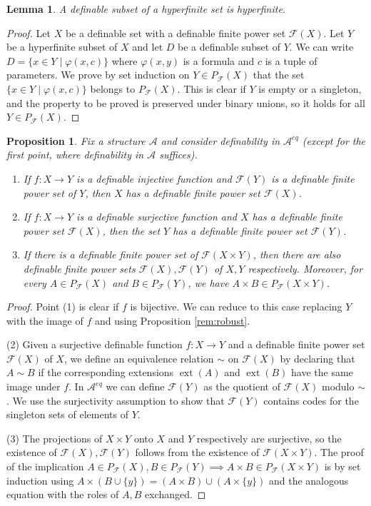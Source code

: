 \documentclass{amsart}
\newcommand{\ca}{\mathcal}
\theoremstyle{plain}
\newtheorem{prop}[thm]{Proposition}
\newtheorem{lem}[thm]{Lemma}
\theoremstyle{definition}
\newcommand{\F}{\mathcal{F}}
\newcommand{\pF}{P_{\ca F}}
\newcommand{\ext}[1]{\operatorname{ext}(#1)}
\begin{document}
\begin{lem} \label{lem:subset} 
A definable subset of a hyperfinite set is hyperfinite. 
\end{lem}
\begin{proof}
Let $X$ be a definable set with a definable finite power set $\F(X)$. Let $Y$ be a hyperfinite subset of $X$ and let $D$ be a definable subset of $Y$. We can write $D = \{x\in Y \mid \varphi(x,c)\}$ where $\varphi(x,y)$ is a formula and $c$ is a tuple of parameters. We prove by set induction on $Y\in \pF(X)$ that the set $\{x\in Y \mid \varphi(x,c)\}$ belongs to $\pF(X)$. This is clear if $Y$ is empty or a singleton, and the property to be proved is preserved under binary unions, so it holds for all $Y\in \pF(X)$. 
\end{proof}

\begin{prop} \label{prop:image} Fix a structure $\ca A$ and consider definability in $\ca A^{eq}$ (except for the first point, where definability in $\ca A$ suffices).  
\begin{enumerate}
\item If $f:X\to Y$ is a definable injective function and $\F(Y)$ is a definable finite power set of $Y$, then $X$ has a definable finite power set $\F(X)$. 

\item If $f:X\to Y$ is a definable surjective function and $X$ has a definable finite power set $\F(X)$, then the set $Y$ has a definable finite power set $\F(Y)$. 
 
\item If there is a definable finite power set of $\F(X\times Y)$, then there are also definable finite power sets $\F(X), \F(Y)$ of $X,Y$ respectively. 
Moreover, for every $A\in \pF(X)$ and $B\in \pF(Y)$, we have $A\times B \in \pF(X\times Y)$.  
\end{enumerate}
\end{prop}

\begin{proof} 
Point (1) is clear if $f$ is bijective. We can reduce to this case replacing $Y$ with the image of $f$ and using Proposition \ref{rem:robust}.

(2) Given a surjective definable function $f:X\to Y$ and a definable finite power set $\F(X)$ of $X$, we define an equivalence relation $\sim$ on $\F(X)$ by declaring that $A\sim B$ if the corresponding extensions $\ext A$ and $\ext B$ have the same image under $f$. In $\ca A^{eq}$ we can define $\F(Y)$ as the quotient of $\F(X)$ modulo $\sim$. We use the surjectivity assumption to show that $\F(Y)$ contains codes for the singleton sets of elements of $Y$.

(3) The projections of $X\times Y$ onto $X$ and $Y$ respectively are surjective, so the existence of $\F(X), \F(Y)$ follows from the existence of $\F(X\times Y)$. The proof of the implication $A\in \pF(X), B\in \pF(Y) \implies A\times B \in \pF(X\times Y)$ is by set induction using $A\times (B \cup \{y\}) = (A \times B) \cup (A \times \{y\})$ and the analogous equation with the roles of $A, B$ exchanged. 
\end{proof}
\end{document}
